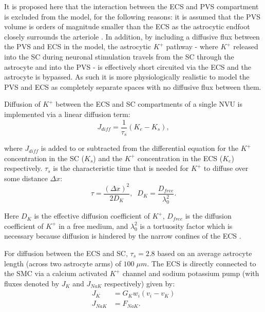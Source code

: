 	It is proposed here that the interaction between the ECS and PVS compartment is excluded from the model, for the following reasons:
	it is assumed that the PVS volume is orders of magnitude smaller than the ECS as the astrocytic endfoot closely surrounds the arteriole \citep{Witthoft2012}. 
	In addition, by including a diffusive flux between the PVS and ECS in the model, the astrocytic $K^+$ pathway - where $K^+$ released into the SC during neuronal stimulation travels from the SC through the astrocyte and into the PVS - is effectively short circuited via the ECS and the astrocyte is bypassed.
	As such it is more physiologically realistic to model the PVS and ECS as completely separate spaces with no diffusive flux between them.
		
	 Diffusion of $K^+$ between the ECS and SC compartments of a single NVU is implemented via a linear diffusion term: 
		\begin{equation}
		J_{diff} = \frac{1}{\tau_s} \left( K_e - K_s \right),
		\label{eq:diffusion}
		\end{equation}
	
	where $J_{diff}$ is added to or subtracted from the differential equation for the $K^+$ concentration in the SC ($K_s$) and the $K^+$ concentration in the ECS ($K_e$) respectively. 
	$\tau_s$ is the characteristic time that is needed for $K^+$ to diffuse over some distance $\Delta x$:
		\begin{equation}
		\tau = \frac{(\Delta x)^2}{2D_K}, \; \; 		D_K = \frac{D_{free}}{\lambda_0^2}.
		\label{eq:tau}
		\end{equation}
		
	Here $D_K$ is the effective diffusion coefficient of $K^+$, $D_{free}$ is the diffusion coefficient of $K^+$ in a free medium, and $\lambda_0^2$ is a tortuosity factor which is necessary because diffusion is hindered by the narrow confines of the ECS \citep{Sykova2008}. 

	For diffusion between the ECS and SC, $\tau_s = 2.8$ based on an average astrocyte length (across two astrocyte arms) of $100 \; \mu m$. 
	The ECS is directly connected to the SMC via a calcium activated $K^+$ channel and sodium potassium pump (with fluxes denoted by $J_K$ and $J_{NaK}$ respectively) given by:
		\begin{align}
		J_K &= G_K w_i (v_i - v_K) \\
		J_{NaK} &= F_{NaK}.
		\end{align}
	
